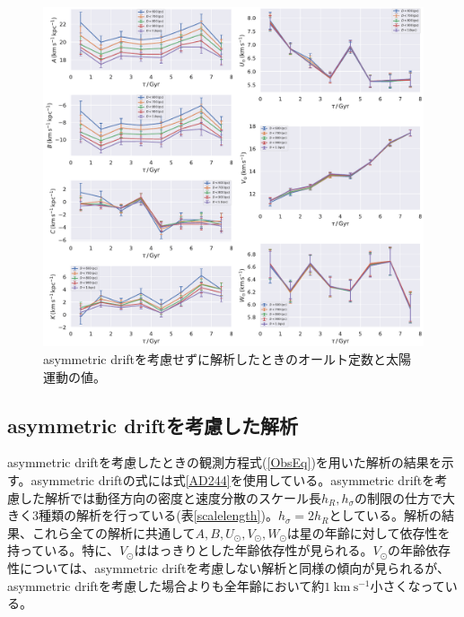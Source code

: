 \begin{figure}[htbp]
	\centering
	\includegraphics[width=15cm]{fig/Observation_woAD.pdf}
	\caption{asymmetric driftを考慮せずに解析したときのオールト定数と太陽運動の値。} \label{fig:woAD}
\end{figure}

\subsection{asymmetric driftを考慮した解析}
asymmetric driftを考慮したときの観測方程式(\ref{ObsEq})を用いた解析の結果を示す。asymmetric driftの式には式\ref{AD244}を使用している。asymmetric driftを考慮した解析では動径方向の密度と速度分散のスケール長$h_R,h_{\sigma}$の制限の仕方で大きく3種類の解析を行っている(表\ref{scalelength})。$h_{\sigma}=2h_R$としている。解析の結果、これら全ての解析に共通して$A,B,U_{\odot},V_{\odot},W_{\odot}$は星の年齢に対して依存性を持っている。特に、$V_{\odot}$ははっきりとした年齢依存性が見られる。$V_{\odot}$の年齢依存性については、asymmetric driftを考慮しない解析と同様の傾向が見られるが、asymmetric driftを考慮した場合よりも全年齢において約$1\ \mathrm{km\ s^{-1}}$小さくなっている。

